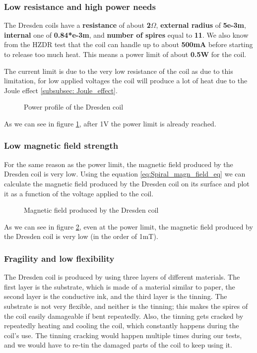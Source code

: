 \subsubsection{Low resistance and high power needs}
The Dresden coils have a \textbf{resistance} of about \textbf{2$\Omega$}, \textbf{external radius} of \textbf{5e-3m}, \textbf{internal} one of \textbf{0.84*e-3m}, and \textbf{number of spires} equal to \textbf{11}.
We also know from the HZDR test that the coil can handle up to about \textbf{500mA} before starting to release too much heat.
This means a power limit of about \textbf{0.5W} for the coil.

The current limit is due to the very low resistance of the coil as due to this limitation, for low applied voltages the coil will produce a lot of heat due to the Joule effect \ref{subsubsec: Joule_effect}.

\begin{figure}
    \centering
    \resizebox{0.5\textwidth}{!}{}
    \caption{Power profile of the Dresden coil}
    \label{fig: Dresden_heat_graph}
\end{figure}
As we can see in figure \ref{fig: Dresden_heat_graph}, after 1V the power limit is already reached.

\subsubsection{Low magnetic field strength}
For the same reason as the power limit, the magnetic field produced by the Dresden coil is very low.
Using the equation \ref{eq:Spiral_magn_field_eq} we can calculate the magnetic field produced by the Dresden coil on its surface and plot it as a function of the voltage applied to the coil.
\begin{figure}
    \centering
    \resizebox{0.5\textwidth}{!}{}
    \caption{Magnetic field produced by the Dresden coil}
    \label{fig: Dresden_magnetic_field}
\end{figure}

As we can see in figure \ref{fig: Dresden_magnetic_field}, even at the power limit, the magnetic field produced by the Dresden coil is very low (in the order of 1mT).

\subsubsection{Fragility and low flexibility}
The Dresden coil is produced by using three layers of different materials.
The first layer is the substrate, which is made of a material similar to paper, the second layer is the conductive ink, and the third layer is the tinning.
The substrate is not very flexible, and neither is the tinning;
this makes the spires of the coil easily damageable if bent repeatedly.
Also, the tinning gets cracked by repeatedly heating and cooling the coil, which constantly happens during the coil's use.
The tinning cracking would happen multiple times during our tests, and we would have to re-tin the damaged parts of the coil to keep using it.




